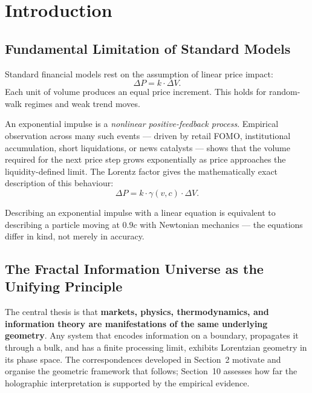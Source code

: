 \documentclass[12pt,a4paper]{article}
\begin{document}
\section{Introduction}

\subsection{Fundamental Limitation of Standard Models}

Standard financial models rest on the assumption of linear price impact:
\begin{equation}
    \Delta P = k \cdot \Delta V.
\end{equation}
Each unit of volume produces an equal price increment. This holds for
random-walk regimes and weak trend moves.

An exponential impulse is a \emph{nonlinear positive-feedback process}.
Empirical observation across many such events --- driven by retail FOMO,
institutional accumulation, short liquidations, or news catalysts ---
shows that the volume required for the next price step grows exponentially
as price approaches the liquidity-defined limit. The Lorentz factor
gives the mathematically exact description of this behaviour:
\begin{equation}
    \Delta P = k \cdot \gamma(v, c) \cdot \Delta V.
\end{equation}

Describing an exponential impulse with a linear equation is equivalent to
describing a particle moving at $0.9c$ with Newtonian mechanics --- the
equations differ in kind, not merely in accuracy.

\subsection{The Fractal Information Universe as the Unifying Principle}

The central thesis is that \textbf{markets, physics, thermodynamics, and
information theory are manifestations of the same underlying geometry}.
Any system that encodes information on a boundary, propagates it through
a bulk, and has a finite processing limit, exhibits Lorentzian geometry in
its phase space. The correspondences developed in Section~2 motivate and
organise the geometric framework that follows; Section~10 assesses how
far the holographic interpretation is supported by the empirical evidence.

\end{document}

